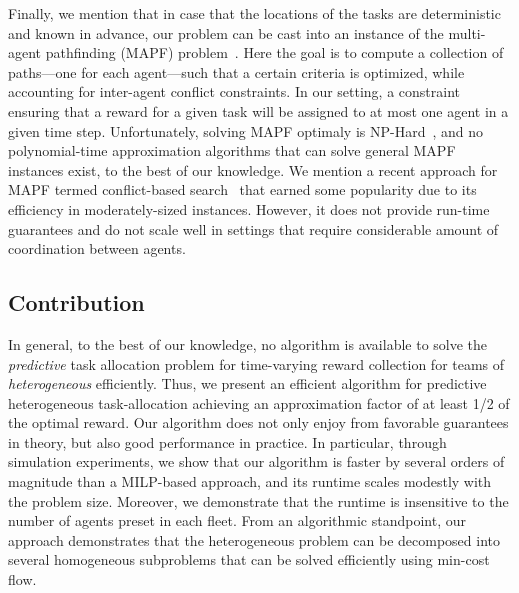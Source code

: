 \documentclass[conference]{IEEEtran}
\newcommand{\frline}[2]{{\color{blue}#1}{\em \color{blue}[FR]: #2}}
\newcommand{\frline}[2]{#1}
\begin{document}
Finally, we mention that in case that the locations of the tasks are deterministic and known in advance, our problem can be cast into an instance of the multi-agent pathfinding (MAPF) problem~\cite{YuLaValle16}. Here the goal is to compute a collection of paths---one for each agent---such that a certain criteria is optimized, while accounting for inter-agent conflict constraints. In our setting, a constraint ensuring that a reward for a given task will be assigned to at most one agent in a given time step. Unfortunately, solving MAPF optimaly is NP-Hard~\cite{yu2013structure}, and no polynomial-time approximation algorithms that can solve general MAPF instances exist, to the best of our knowledge. We mention a recent approach for MAPF termed conflict-based search~\cite{felner2017search,ma2017lifelong,honig2018conflict,liu2019task} that earned some popularity due to its efficiency in moderately-sized instances. However, it does not provide run-time guarantees and do not scale well in settings that require considerable amount of coordination between agents. 

\subsection{Contribution}
In general, to the best of our knowledge, no algorithm is available to solve the \emph{predictive} task allocation problem for time-varying reward collection for teams of \emph{heterogeneous} efficiently.
Thus, we present an efficient algorithm for predictive heterogeneous task-allocation achieving an approximation factor of at least 1/2 of the optimal reward. Our algorithm does not only enjoy from favorable guarantees in theory, but also good performance in practice. In particular, through simulation experiments, we show that our algorithm is faster by several orders of magnitude than a MILP-based approach, and its runtime scales modestly with the problem size. Moreover, we demonstrate that the runtime is insensitive to the number of agents preset in each fleet. From an algorithmic standpoint, our approach demonstrates that the heterogeneous problem can be decomposed into several homogeneous subproblems that can be solved efficiently using min-cost flow. 

\end{document}
